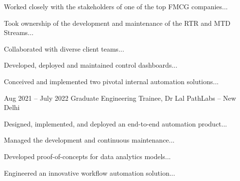 \documentclass[10pt, letterpaper]{article}
\begin{document}
\vspace{0.10 cm}
\begin{onecolentry}
\begin{highlights}

    \item Worked closely with the stakeholders of one of the top FMCG companies...

    \item Took ownership of the development and maintenance of the RTR and MTD Streams...

    \item Collaborated with diverse client teams...

    \item Developed, deployed and maintained control dashboards...

    \item Conceived and implemented two pivotal internal automation solutions...

\end{highlights}
\end{onecolentry}
\vspace{0.2 cm}

\begin{twocolentry}{ Aug 2021 -- July 2022 }
    Graduate Engineering Trainee, Dr Lal PathLabs -- New Delhi
\end{twocolentry}

\vspace{0.10 cm}
\begin{onecolentry}
\begin{highlights}

    \item Designed, implemented, and deployed an end-to-end automation product...

    \item Managed the development and continuous maintenance...

    \item Developed proof-of-concepts for data analytics models...

    \item Engineered an innovative workflow automation solution...

\end{highlights}
\end{onecolentry}
\vspace{0.2 cm}
\end{document}
